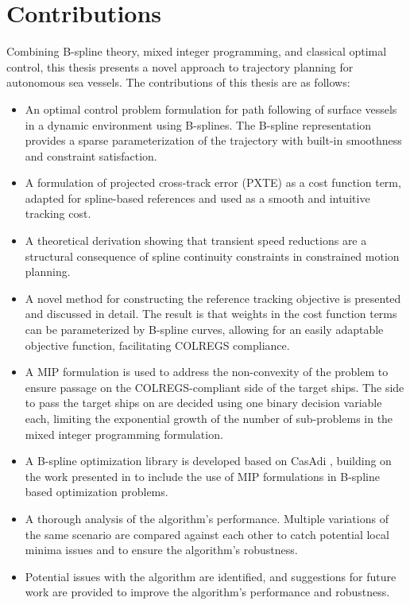 \section{Contributions}

Combining B-spline theory, mixed integer programming, and classical optimal control, this thesis presents a novel approach to trajectory planning for autonomous sea vessels. The contributions of this thesis are as follows:

\begin{itemize}
    \item An optimal control problem formulation for path following of surface vessels in a dynamic environment using B-splines. The B-spline representation provides a sparse parameterization of the trajectory with built-in smoothness and constraint satisfaction.
    \item A formulation of projected cross-track error (PXTE) as a cost function term, adapted for spline-based references and used as a smooth and intuitive tracking cost.
    \item  A theoretical derivation showing that transient speed reductions are a structural consequence of spline continuity constraints in constrained motion planning.
    \item A novel method for constructing the reference tracking objective is presented and discussed in detail. The result is that weights in the cost function terms can be parameterized by B-spline curves, allowing for an easily adaptable objective function, facilitating COLREGS compliance.
    \item A \acrfull{MIP} formulation is used to address the non-convexity of the problem to ensure passage on the COLREGS-compliant side of the target ships.
    The side to pass the target ships on are decided using one binary decision variable each, limiting the exponential growth of the number of sub-problems in the mixed integer programming formulation.
    \item A B-spline optimization library is developed based on CasAdi \citep{casadi}, building on the work presented in \citet{mercy2016spline} to include the use of \gls{MIP} formulations in B-spline based optimization problems.
    \item A thorough analysis of the algorithm's performance. Multiple variations of the same scenario are compared against each other to catch potential local minima issues and to ensure the algorithm's robustness.
    \item Potential issues with the algorithm are identified, and suggestions for future work are provided to improve the algorithm's performance and robustness.
\end{itemize}


